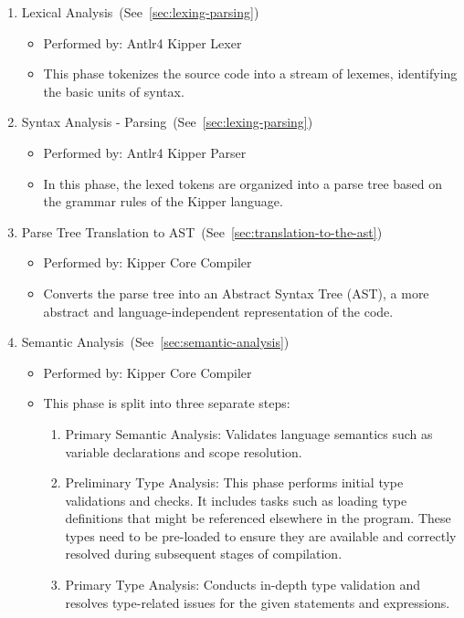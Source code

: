 \begin{enumerate}
	\item Lexical Analysis~(See~\ref{sec:lexing-parsing})
	\begin{itemize}
		\item Performed by: Antlr4 Kipper Lexer
		\item This phase tokenizes the source code into a stream of lexemes, identifying the basic units of syntax.
	\end{itemize}
	\item Syntax Analysis - Parsing~(See~\ref{sec:lexing-parsing})
	\begin{itemize}
		\item Performed by: Antlr4 Kipper Parser
		\item In this phase, the lexed tokens are organized into a parse tree based on the grammar rules of the Kipper language.
	\end{itemize}
	\item Parse Tree Translation to AST~(See~\ref{sec:translation-to-the-ast})
	\begin{itemize}
		\item Performed by: Kipper Core Compiler
		\item Converts the parse tree into an Abstract Syntax Tree (AST), a more abstract and language-independent representation of the code.
	\end{itemize}
	\item Semantic Analysis~(See~\ref{sec:semantic-analysis})
	\begin{itemize}
		\item Performed by: Kipper Core Compiler
		\item This phase is split into three separate steps:
		\begin{enumerate}
			\item Primary Semantic Analysis: Validates language semantics such as variable declarations and scope resolution.
			\item Preliminary Type Analysis: This phase performs initial type validations and checks. It includes tasks such as loading type definitions that might be referenced elsewhere in the program. These types need to be pre-loaded to ensure they are available and correctly resolved during subsequent stages of compilation.
			\item Primary Type Analysis: Conducts in-depth type validation and resolves type-related issues for the given statements and expressions.
		\end{enumerate}
	\end{itemize}

\end{enumerate}
